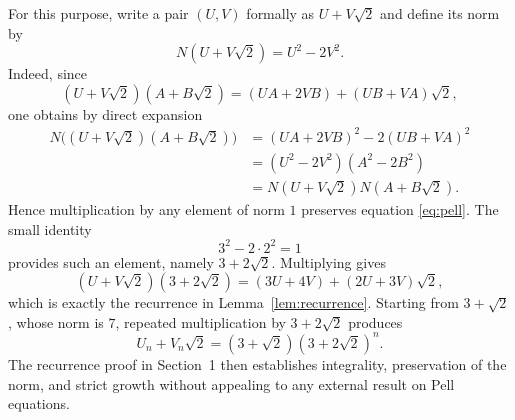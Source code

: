 \documentclass[11pt]{article}
\theoremstyle{remark}
\begin{document}
For this purpose, write a pair $(U,V)$ formally as $U+V\sqrt2$ and define its norm by
\[
 N(U+V\sqrt2)=U^2-2V^2.
\]
Indeed, since
\[
 (U+V\sqrt2)(A+B\sqrt2)=(UA+2VB)+(UB+VA)\sqrt2,
\]
one obtains by direct expansion
\begin{align*}
 N\bigl((U+V\sqrt2)(A+B\sqrt2)\bigr)
 &=(UA+2VB)^2-2(UB+VA)^2\\
 &=(U^2-2V^2)(A^2-2B^2)\\
 &=N(U+V\sqrt2)N(A+B\sqrt2).
\end{align*}  Hence multiplication by any element of norm $1$ preserves equation \eqref{eq:pell}.  The small identity
\[
 3^2-2\cdot2^2=1
\]
provides such an element, namely $3+2\sqrt2$.  Multiplying gives
\[
 (U+V\sqrt2)(3+2\sqrt2)
   =(3U+4V)+(2U+3V)\sqrt2,
\]
which is exactly the recurrence in Lemma~\ref{lem:recurrence}.  Starting from $3+\sqrt2$, whose norm is $7$, repeated multiplication by $3+2\sqrt2$ produces
\[
 U_n+V_n\sqrt2=(3+\sqrt2)(3+2\sqrt2)^n.
\]
The recurrence proof in Section~1 then establishes integrality, preservation of the norm, and strict growth without appealing to any external result on Pell equations.
\end{document}
